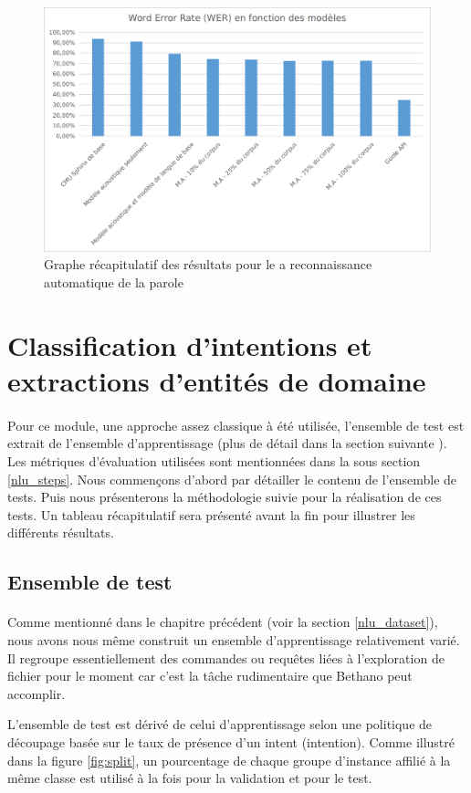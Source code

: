 	\begin{figure}[H]
		\centering
		\includegraphics[width=.9\linewidth]{images/implementation/asr_graph.png} 
		\caption{Graphe récapitulatif des résultats pour le a reconnaissance automatique de la parole}
		\label{fig:asr_results}
	\end{figure}
\section{Classification d'intentions et extractions d'entités de domaine}
\paragraph{}
Pour ce module, une approche assez classique à été utilisée, l'ensemble de test est extrait de l'ensemble d'apprentissage (plus de détail dans la section suivante ). Les métriques d'évaluation utilisées sont mentionnées dans la sous section \ref{nlu_steps}. Nous commençons d'abord par détailler le contenu de l'ensemble de tests. Puis nous présenterons la méthodologie suivie pour la réalisation de ces tests. Un tableau récapitulatif sera présenté avant la fin pour illustrer les différents résultats.
	\subsection{Ensemble de test}
	\paragraph{}
	Comme mentionné dans le chapitre précédent (voir la section \ref{nlu_dataset}), nous avons nous même construit un ensemble d'apprentissage relativement varié. Il regroupe essentiellement des commandes ou requêtes liées à l'exploration de fichier pour le moment car c'est la tâche rudimentaire que Bethano peut accomplir.
	\par
	L'ensemble de test est dérivé de celui d'apprentissage selon une politique de découpage basée sur le taux de présence d'un intent (intention). Comme illustré dans la figure \ref{fig:split}, un pourcentage de chaque groupe d'instance affilié à la même classe est utilisé à la fois pour la validation et pour le test.
	

